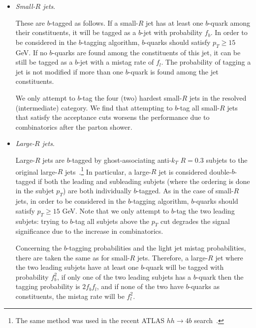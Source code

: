 \begin{itemize}

\item {\it Small-$R$ jets}.

  These are $b$-tagged as follows.
  If a small-$R$ jet has at least one $b$-quark among their constituents,
  it will be tagged as a $b$-jet with probability $f_b$.
  In order to be considered in the $b$-tagging algorithm,
   $b$-quarks should satisfy $p_T \ge 15$ GeV.
  If no $b$-quarks are found among the constituents
  of this jet, it can be still be tagged as a $b$-jet with
  a mistag rate of $f_l$.
  The probability of tagging a jet is not modified
  if more than one $b$-quark is found among the jet constituents.

  We only attempt to $b$-tag the four (two) hardest small-$R$ jets
  in the resolved (intermediate) category.
  We find that
  attempting to $b$-tag all
  small-$R$ jets that satisfy the acceptance cuts worsens the performance
  due to combinatorics after the parton shower.

  \item {\it Large-$R$ jets}.

    Large-$R$ jets are $b$-tagged by
    ghost-associating anti-$k_T$ $R=0.3$
    subjets to the original large-$R$
    jets~\cite{Cacciari:2007fd,Aad:2013gja,
      ATLAS-CONF-2014-004}.\footnote{The same
    method was used in the recent ATLAS $hh\to 4b$ search~\cite{Aad:2015uka}.}
    In particular,
    a large-$R$ jet is considered  double-$b$-tagged if both
    the leading and subleading subjets (where the ordering
    is done in the subjet $p_T$) are both individually $b$-tagged.
    As in the case
    of small-$R$ jets, in
    order to be considered in the $b$-tagging algorithm,
   $b$-quarks should satisfy $p_T \ge 15$ GeV.
    Note that we only attempt to $b$-tag the two leading subjets:
    trying to $b$-tag all subjets above the $p_T$ cut degrades
    the signal significance due to the increase in combinatorics.

    Concerning the $b$-tagging probabilities and the
    light jet mistag probabilities, there are taken
    the same as for small-$R$ jets.
    Therefore, a large-$R$ jet where the two leading
    subjets have at least one $b$-quark will be tagged
    with probability $f_b^2$, if only one of the two leading
    subjets has a $b$-quark then the tagging probability is
    $2f_bf_l$, and if none of the two have $b$-quarks
    as constituents, the mistag rate will be
    $f_l^2$.


\end{itemize}

